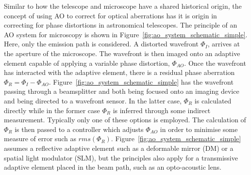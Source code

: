 Similar to how the telescope and microscope have a shared historical origin,
the concept of using AO to correct for optical aberrations has it is 
origin in correcting for phase distortions in astronomical telescopes\cite{babcock1990adaptive}.
The principle of an AO system for microscopy is shown in 
Figure~\ref{fig:ao_system_schematic_simple}. Here, only the emission path 
is considered. A distorted wavefront $\Phi_{I}$, arrives at the aperture 
of the microscope. The wavefront is then imaged onto an adaptive element 
capable of applying a variable phase distortion, $\Phi_{AO}$. Once the 
wavefront has interacted with the adaptive element, there is a residual 
phase aberration $\Phi_{R} = \Phi_{I} - \Phi_{AO}$. 
Figure~\ref{fig:ao_system_schematic_simple} has the wavefront passing through
a beamsplitter and both being focused onto an imaging device and being 
directed to a wavefront sensor. In the latter case, $\Phi_{R}$ is 
calculated directly while in the former case $\Phi_{R}$ is inferred through 
some indirect measurement. Typically only one of these options is employed. 
The calculation of $\Phi_{R}$ is then passed to a controller which adjusts 
$\Phi_{AO}$ in order to minimise some measure of error such as $rms(\Phi_{R})$. 
Figure~\ref{fig:ao_system_schematic_simple} assumes a reflective adaptive 
element such as a deformable mirror (DM) or a spatial light modulator (SLM), 
but the principles also apply for a transmissive adaptive element placed 
in the beam path, such as an opto-acoustic lens.

